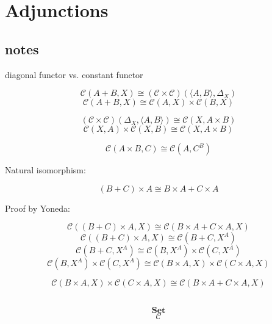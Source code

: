 \documentclass[DaoFP]{subfiles}
\begin{document}
\setcounter{chapter}{9}

\chapter{Adjunctions}
\section{notes}

diagonal functor vs. constant functor

\[  \mathcal{C} (A + B, X) \cong (\mathcal{C} \times \mathcal{C})( \langle A, B \rangle , \Delta_X)\]
\[  \mathcal{C} (A + B, X) \cong \mathcal{C}( A , X) \times \mathcal{C}( B , X)\]

\[  (\mathcal{C} \times \mathcal{C})( \Delta_X,  \langle A, B \rangle ) \cong  \mathcal{C} (X, A \times B)  \]
\[  \mathcal{C} (X, A) \times \mathcal{C}(X, B) \cong  \mathcal{C} (X, A \times B)  \]

\[  \mathcal{C}(A \times B, C ) \cong  \mathcal{C} (A, C^B)  \]


Natural isomorphism:

\[(B + C) \times A \cong B \times A + C \times A \]

Proof by Yoneda:

\[  \mathcal{C} ((B + C) \times A, X) \cong \mathcal{C}(B \times A + C \times A, X) \]
\[  \mathcal{C} ((B + C) \times A, X) \cong \mathcal{C}(B + C, X^A) \]
\[  \mathcal{C}(B + C, X^A) \cong \mathcal{C}(B, X^A) \times \mathcal{C}(C, X^A)\]
\[  \mathcal{C}(B, X^A) \times \mathcal{C}(C, X^A) \cong \mathcal{C}(B \times A, X) \times \mathcal{C}(C \times A, X)\]

\[ \mathcal{C}(B \times A, X) \times \mathcal{C}(C \times A, X) \cong \mathcal{C}(B \times A + C \times A, X) \]

\begin{exercise}
\end{exercise}
\begin{haskell}
\end{haskell}
\[
 \begin{tikzcd}
  \end{tikzcd}
\]

\[   \mathbf{Set} \]
\[   \mathcal{C} \]
\end{document}
